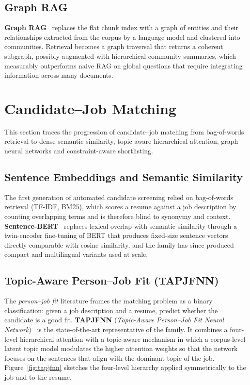 \subsection{Graph RAG}
\textbf{Graph RAG}~\cite{edge2024graphrag} replaces the flat chunk
index with a graph of entities and their relationships extracted from
the corpus by a language model and clustered into communities.
Retrieval becomes a graph traversal that returns a coherent subgraph,
possibly augmented with hierarchical community summaries, which
measurably outperforms naive RAG on global questions that require
integrating information across many documents.

\section{Candidate--Job Matching}

This section traces the progression of candidate--job matching from
bag-of-words retrieval to dense semantic similarity, topic-aware
hierarchical attention, graph neural networks and constraint-aware
shortlisting.

\subsection{Sentence Embeddings and Semantic Similarity}
The first generation of automated candidate screening relied on
bag-of-words retrieval (TF-IDF, BM25), which scores a resume against a
job description by counting overlapping terms and is therefore blind to
synonymy and context. \textbf{Sentence-BERT}~\cite{reimers2019sbert}
replaces lexical overlap with semantic similarity through a twin-encoder
fine-tuning of \acs{BERT} that produces fixed-size sentence vectors
directly comparable with cosine similarity, and the family has since
produced compact and multilingual variants used at scale.

\subsection{Topic-Aware Person--Job Fit (TAPJFNN)}
The \emph{person--job fit} literature frames the matching problem as a
binary classification: given a job description and a resume, predict
whether the candidate is a good fit. \textbf{TAPJFNN}
(\emph{Topic-Aware Person--Job Fit Neural
Network})~\cite{qin2020tapjfnn} is the state-of-the-art representative
of the family. It combines a four-level hierarchical attention with a
topic-aware mechanism in which a corpus-level latent topic model
modulates the higher attention weights so that the network focuses on
the sentences that align with the dominant topic of the job.
Figure~\ref{fig:tapjfnn} sketches the four-level hierarchy applied
symmetrically to the job and to the resume.

